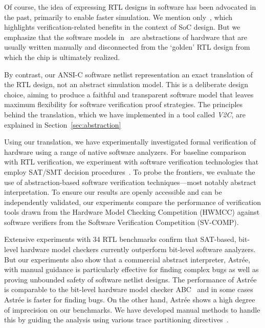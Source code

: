 Of course, the idea of expressing RTL designs in software has been  advocated in the past, primarily to enable faster simulation. We mention only~\cite{soc-keating}, which highlights verification-related benefits in the context of SoC design.  But we emphasize that the software models in~\cite{soc-keating} are abstractions of hardware that are usually written manually and disconnected from the `golden' RTL design  from which the chip is ultimately realized.  

By contrast, our ANSI-C software netlist representation an exact translation of the RTL design, not an abstract simulation model. This is a deliberate design choice, aiming to produce a faithful and transparent software model that leaves maximum flexibility for software verification proof strategies. The principles behind the translation, which we have implemented in a tool called \emph{V2C}, are explained in Section~\ref{sec:abstraction}

Using our translation, we have experimentally investigated formal verification of hardware using a range of 
native software analyzers.  For baseline comparison with RTL verification, we experiment with software verification technologies that employ SAT/SMT decision procedures~\cite{DBLP:conf/cav/BeyerK11,2ls,cbmc.tacas:2004,DBLP:conf/tacas/HeizmannDGLMSP16}. To 
probe the frontiers, we evaluate the use of abstraction-based software verification 
techniques---most notably abstract interpretation. To ensure our results are openly accessible and can be independently validated, our experiments compare the performance of verification tools drawn from  the Hardware Model Checking Competition (HWMCC) against software verifiers from the Software Verification Competition (SV-COMP).

Extensive experiments with 34 RTL benchmarks confirm that SAT-based, bit-level hardware model checkers currently outperform bit-level software analyzers.  But our experiments also show that a commercial abstract interpreter, Astr{\'e}e, with manual guidance is particularly effective for finding complex bugs as well as proving unbounded safety of software netlist designs. The performance of Astr{\'e}e is comparable to the bit-level hardware model checker ABC~\cite{abc} and in some cases Astr{\'e}e is faster for finding bugs.  On the other hand,
Astr{\'e}e shows a high degree of imprecision on our benchmarks. We have developed manual methods to handle this by guiding the analysis using various trace partitioning directives~\cite{DBLP:journals/toplas/RivalM07}.

